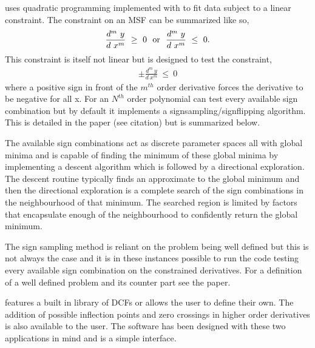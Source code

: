\documentclass[letterpaper,10pt,english]{sphinxmanual}
\begin{document}
 uses quadratic programming implemented with  to fit
data subject to a linear constraint. The constraint on an MSF can be
summarized like so,
\begin{equation*}
\begin{split}\frac{d^m~y}{d~x^m}~\geq~0~~\textnormal{or}~~\frac{d^m~y}{d~x^m}~\leq~0.\end{split}
\end{equation*}
This constraint is itself not linear but  is designed to test the
constraint,
\begin{equation*}
\begin{split}\pm \frac{d^m~y}{d~x^m}~\leq~0\end{split}
\end{equation*}
where a positive sign in front of the \(m^{th}\) order derivative forces the derivative
to be negative for all x. For an \(N^{th}\) order polynomial  can test
every available sign combination but by default it implements a \textquotesingle{}sign\sphinxhyphen{}sampling\textquotesingle{}/\textquotesingle{}sign\sphinxhyphen{}flipping\textquotesingle{}
algorithm. This is detailed in the  paper (see citation) but is summarized
below.

The available sign combinations act as discrete parameter spaces all with
global minima and  is capable of finding the minimum of these global
minima by implementing a descent algorithm which is followed by a directional
exploration. The descent routine typically finds an approximate to the global
minimum and then the directional exploration is a complete search
of the sign combinations in the neighbourhood
of that minimum. The searched region is limited by factors
that encapsulate enough of the neighbourhood to confidently return the global minimum.

The sign sampling method is reliant on the problem being \textquotesingle{}well defined\textquotesingle{} but this
is not always the case and it is in these instances possible to run the code testing
every available sign combination on the constrained derivatives. For a definition of
a \textquotesingle{}well defined\textquotesingle{} problem and it\textquotesingle{}s counter part see the  paper.

 features a built in library of DCFs or
allows the user to define their own. The addition of possible inflection points
and zero crossings in higher order derivatives is also available to the user.
The software has been designed with these two
applications in mind and is a simple interface.
\end{document}
